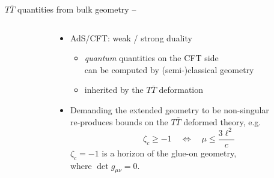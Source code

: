 \documentclass[
	10pt
	,handout
	,noamsthm
]{beamer}
\newcommand{\TTbar}{\texorpdfstring{\ensuremath{T\bar{T}}}{TTbar}\xspace}
\begin{document}
\begin{frame}{\TTbar quantities from bulk geometry}{%
	\textcite{Apolo:2023vnm} -- 
}
\begin{columns}
\begin{column}{.35\textwidth}
\figGlueon
\end{column}
\begin{column}{.65\textwidth}
\begin{itemize}
\item AdS/CFT: weak / strong duality
	\begin{itemize}
	\item \textit{quantum} quantities on the CFT side\\
		can be computed by (semi-)classical geometry
	\item inherited by the \TTbar deformation
	\end{itemize}
	
\pause
\item Demanding the extended geometry to be non-singular\\
	re-produces bounds on the \TTbar deformed theory, e.g.
	\begin{equation}
		\zeta_c \ge -1 \quad \Leftrightarrow \quad\mu\le \frac{ 3\ell^2 }{c} \label{reality}
	\end{equation}
	$\zeta_c = -1$ is a horizon of the glue-on geometry, \\
	where $\det g_{\mu\nu} = 0$.
	
\end{itemize}
\end{column}
\end{columns}
\end{frame}
\end{document}
